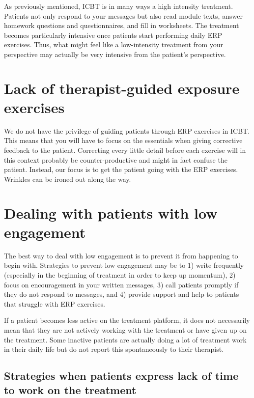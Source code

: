 \documentclass[]{book}
\theoremstyle{definition}
\theoremstyle{definition}
\theoremstyle{definition}
\theoremstyle{remark}
\begin{document}
As previously mentioned, ICBT is in many ways a high intensity
treatment. Patients not only respond to your messages but also read
module texts, answer homework questions and questionnaires, and fill in
worksheets. The treatment becomes particularly intensive once patients
start performing daily ERP exercises. Thus, what might feel like a
low-intensity treatment from your perspective may actually be very
intensive from the patient's perspective.

\hypertarget{lack-of-therapist-guided-exposure-exercises}{%
\section{Lack of therapist-guided exposure
exercises}\label{lack-of-therapist-guided-exposure-exercises}}

We do not have the privilege of guiding patients through ERP exercises
in ICBT. This means that you will have to focus on the essentials when
giving corrective feedback to the patient. Correcting every little
detail before each exercise will in this context probably be
counter-productive and might in fact confuse the patient. Instead, our
focus is to get the patient going with the ERP exercises. Wrinkles can
be ironed out along the way.

\hypertarget{dealing-with-patients-with-low-engagement}{%
\section{Dealing with patients with low
engagement}\label{dealing-with-patients-with-low-engagement}}

The best way to deal with low engagement is to prevent it from happening
to begin with. Strategies to prevent low engagement may be to 1) write
frequently (especially in the beginning of treatment in order to keep up
momentum), 2) focus on encouragement in your written messages, 3) call
patients promptly if they do not respond to messages, and 4) provide
support and help to patients that struggle with ERP exercises.

If a patient becomes less active on the treatment platform, it does not
necessarily mean that they are not actively working with the treatment
or have given up on the treatment. Some inactive patients are actually
doing a lot of treatment work in their daily life but do not report this
spontaneously to their therapist.

\hypertarget{strategies-when-patients-express-lack-of-time-to-work-on-the-treatment}{%
\subsection{Strategies when patients express lack of time to work on the
treatment}\label{strategies-when-patients-express-lack-of-time-to-work-on-the-treatment}}
\end{document}
